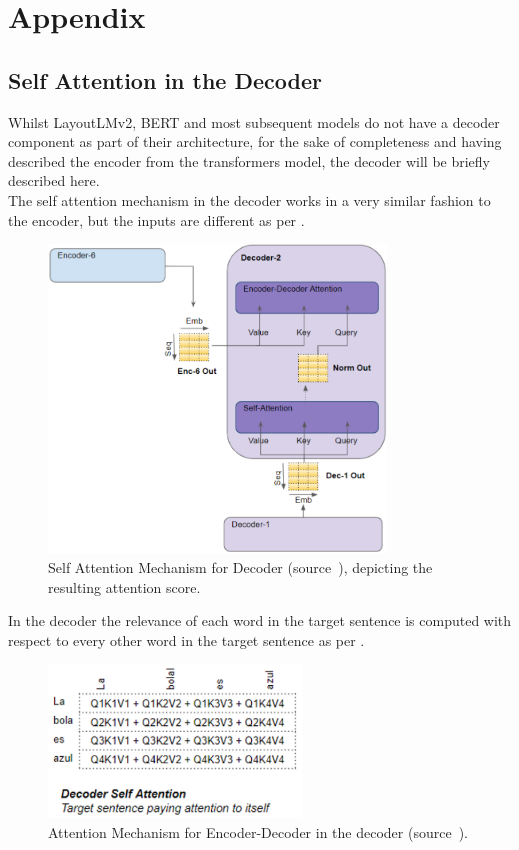 \chapter{Appendix}
\label{chap:appendix}
\section{Self Attention in the Decoder}
Whilst LayoutLMv2, BERT and most subsequent models do not have a decoder component as 
part of their architecture, for the sake of completeness and having described the encoder
from the transformers model, the decoder will be briefly described here.\\
The self attention mechanism in the decoder works in a very similar fashion to the encoder, but the inputs are different as per .
\begin{figure}[H]
	\centering
	\includegraphics[width=0.8\textwidth]{figures/atn_decoder.png}
	\caption{Self Attention Mechanism for Decoder (source~\autocite{doshiTransformersExplainedVisually2021b}), depicting the resulting attention score.}
	\label{fig:atn_decoder}
\end{figure}
In the decoder the relevance of each word in the target sentence is computed with respect to every other word in the target sentence
as per .
\begin{figure}[H]
	\centering
	\includegraphics[width=0.6\textwidth]{figures/decoder_self_atn.png}
	\caption{Attention Mechanism for Encoder-Decoder in the decoder (source~\autocite{doshiTransformersExplainedVisually2021b}).}
	\label{fig:decoder_self_atn}
\end{figure}

